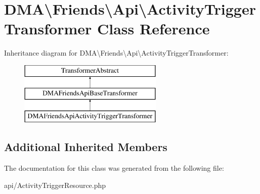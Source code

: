 \hypertarget{classDMA_1_1Friends_1_1Api_1_1ActivityTriggerTransformer}{\section{D\-M\-A\textbackslash{}Friends\textbackslash{}Api\textbackslash{}Activity\-Trigger\-Transformer Class Reference}
\label{classDMA_1_1Friends_1_1Api_1_1ActivityTriggerTransformer}
}
Inheritance diagram for D\-M\-A\textbackslash{}Friends\textbackslash{}Api\textbackslash{}Activity\-Trigger\-Transformer\-:\begin{figure}[H]
\begin{center}
\leavevmode
\includegraphics[height=3.000000cm]{df/dd0/classDMA_1_1Friends_1_1Api_1_1ActivityTriggerTransformer}
\end{center}
\end{figure}
\subsection*{Additional Inherited Members}


The documentation for this class was generated from the following file\-:\begin{DoxyCompactItemize}
\item 
api/Activity\-Trigger\-Resource.\-php\end{DoxyCompactItemize}
